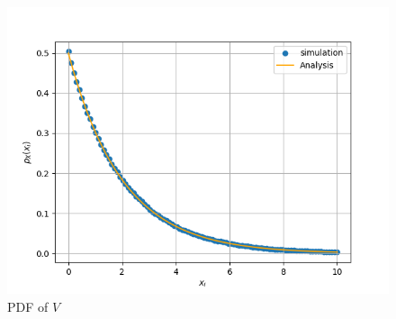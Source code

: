 \documentclass[journal,10pt,twocolumn]{article}
\begin{document}
\begin{enumerate}
\begin{figure}[h]
\centering
\includegraphics[width=\columnwidth]{./chapters/ch4/figs/ch4_squarespdf.png}
\caption{PDF of $V$}
\label{fig:chisq_pdf}
\end{figure}
%


\end{enumerate}
\end{document}
